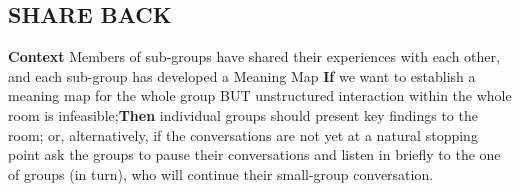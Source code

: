 \subsection*{SHARE BACK {\hfill\sensory}}

\textbf{Context} Members of sub-groups have shared their experiences with each other, and each sub-group has
developed a {\sc Meaning Map} \newline \textbf{If} we want to
establish a meaning map for the whole group BUT unstructured
interaction within the whole room is infeasible;\newline \textbf{Then}
individual groups should present key findings to the room; or,
alternatively, if the conversations are not yet at a natural stopping
point ask the groups to pause their conversations and listen in briefly
to the one of groups (in turn), who will continue their small-group
conversation.
